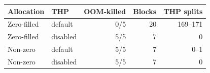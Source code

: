 \begin{tabular}{llrrr}
\toprule
Allocation & THP & OOM-killed & Blocks & THP splits \\
\midrule
Zero-filled & default & 0/5 & 20 & 169--171 \\
Zero-filled & disabled & 5/5 & 7 & 0 \\
Non-zero & default & 5/5 & 7 & 0--1 \\
Non-zero & disabled & 5/5 & 7 & 0 \\
\bottomrule
\end{tabular}
